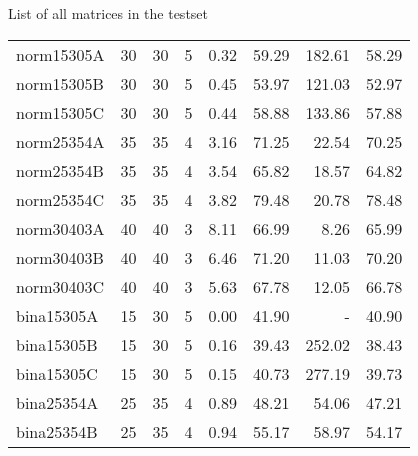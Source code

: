  \begin{scriptsize} 
 \begin{table}[h]
  \caption{List of all matrices in the testset} 
 \end{table}
\vspace{-0.33cm}
 \tablelasttail{\bottomrule} \label{MatrixList}
\begin{xtabular*}{\linewidth}{@{\extracolsep{\fill}}lrrrrrrr@{}} 
 norm15305A & \num{30} & \num{30} & \num{5} & \num{0.32} & \num{59.29} & \num{182.61} & \num{58.29} \\ 
norm15305B & \num{30} & \num{30} & \num{5} & \num{0.45} & \num{53.97} & \num{121.03} & \num{52.97} \\ 
norm15305C & \num{30} & \num{30} & \num{5} & \num{0.44} & \num{58.88} & \num{133.86} & \num{57.88} \\ 
norm25354A & \num{35} & \num{35} & \num{4} & \num{3.16} & \num{71.25} & \num{22.54} & \num{70.25} \\ 
norm25354B & \num{35} & \num{35} & \num{4} & \num{3.54} & \num{65.82} & \num{18.57} & \num{64.82} \\ 
norm25354C & \num{35} & \num{35} & \num{4} & \num{3.82} & \num{79.48} & \num{20.78} & \num{78.48} \\ 
norm30403A & \num{40} & \num{40} & \num{3} & \num{8.11} & \num{66.99} & \num{8.26} & \num{65.99} \\ 
norm30403B & \num{40} & \num{40} & \num{3} & \num{6.46} & \num{71.20} & \num{11.03} & \num{70.20} \\ 
norm30403C & \num{40} & \num{40} & \num{3} & \num{5.63} & \num{67.78} & \num{12.05} & \num{66.78} \\ 
bina15305A & \num{15} & \num{30} & \num{5} & \num{0.00} & \num{41.90} & - & \num{40.90} \\ 
bina15305B & \num{15} & \num{30} & \num{5} & \num{0.16} & \num{39.43} & \num{252.02} & \num{38.43} \\ 
bina15305C & \num{15} & \num{30} & \num{5} & \num{0.15} & \num{40.73} & \num{277.19} & \num{39.73} \\ 
bina25354A & \num{25} & \num{35} & \num{4} & \num{0.89} & \num{48.21} & \num{54.06} & \num{47.21} \\ 
bina25354B & \num{25} & \num{35} & \num{4} & \num{0.94} & \num{55.17} & \num{58.97} & \num{54.17} \\ 

\end{xtabular*}
\end{scriptsize}
